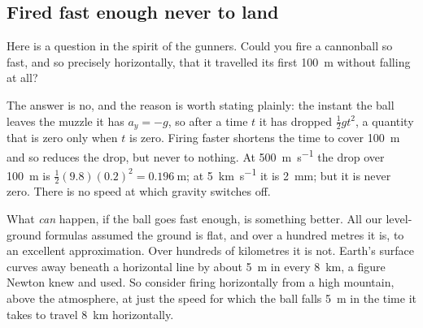 \documentclass[11pt,twoside,openany]{book}
\begin{document}
\subsection{Fired fast enough never to land}

Here is a question in the spirit of the gunners. Could you fire a cannonball so fast, and so precisely horizontally, that it travelled its first \SI{100}{\metre} without falling at all?

The answer is no, and the reason is worth stating plainly: the instant the ball leaves the muzzle it has $a_y = -g$, so after a time $t$ it has dropped $\tfrac12 g t^2$, a quantity that is zero only when $t$ is zero. Firing faster shortens the time to cover \SI{100}{\metre} and so reduces the drop, but never to nothing. At \SI{500}{\metre\per\second} the drop over \SI{100}{\metre} is $\tfrac12(9.8)(0.2)^2 = \SI{0.196}{\metre}$; at \SI{5}{\kilo\metre\per\second} it is \SI{2}{\milli\metre}; but it is never zero. There is no speed at which gravity switches off.

What \emph{can} happen, if the ball goes fast enough, is something better. All our level-ground formulas assumed the ground is flat, and over a hundred metres it is, to an excellent approximation. Over hundreds of kilometres it is not. Earth's surface curves away beneath a horizontal line by about \SI{5}{\metre} in every \SI{8}{\kilo\metre}, a figure Newton knew and used. So consider firing horizontally from a high mountain, above the atmosphere, at just the speed for which the ball falls \SI{5}{\metre} in the time it takes to travel \SI{8}{\kilo\metre} horizontally.
\end{document}
